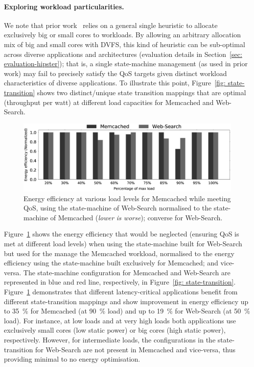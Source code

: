 \paragraph{Exploring workload particularities.} We note that prior
work~\citep{Petrucci2015Octopus-Man:Computers} relies on a general single heuristic to
allocate exclusively big or small cores to workloads. By allowing an arbitrary allocation
mix of big and small cores with DVFS, this kind of heuristic can be sub-optimal across
diverse applications and architectures (evaluation details in Section~\ref{sec:
evaluation-hipster}); that is, a single state-machine management (as used in prior work)
may fail to precisely satisfy the QoS targets given distinct workload characteristics of
diverse applications. To illustrate this point, Figure~\ref{fig: state-transition} shows
two distinct/unique state transition mappings that are optimal (throughput per watt) at
different load capacities for Memcached and Web-Search.

\begin{figure}[t!]
    \centering
    \includegraphics[width=\textwidth]{Chapter4/Figs/config_exchange_new.eps}
    \caption[Energy efficiency of Memcached and Web-Search with state-machines exchanged.]{ Energy efficiency at various load levels for Memcached while meeting QoS, using the state-machine of Web-Search normalised to the state-machine of Memcached (\textit{lower is worse}); converse for Web-Search.}
    \label{fig:config-exchange}
\end{figure}

Figure~\ref{fig:config-exchange} shows the energy efficiency that would be neglected
(ensuring QoS is met at different load levels) when using the state-machine built for
Web-Search but used for the manage the Memcached workload, normalised to the energy
efficiency using the state-machine built exclusively for Memcached; and vice-versa. The
state-machine configuration for Memcached and Web-Search are represented in blue and red
line, respectively, in Figure~\ref{fig: state-transition}.
Figure~\ref{fig:config-exchange} demonstrates that different latency-critical applications
benefit from different state-transition mappings and show improvement in energy efficiency
up to \SI{35}{\percent} for Memcached (at \SI{90}{\percent} load) and up to
\SI{19}{\percent} for Web-Search (at \SI{50}{\percent} load).  For instance, at low loads
and at very high loads both applications use exclusively small cores (low static power) or
big cores (high static power), respectively.  However, for intermediate loads, the
configurations in the state-transition for Web-Search are not present in Memcached and
vice-versa, thus providing minimal to no energy optimisation.

